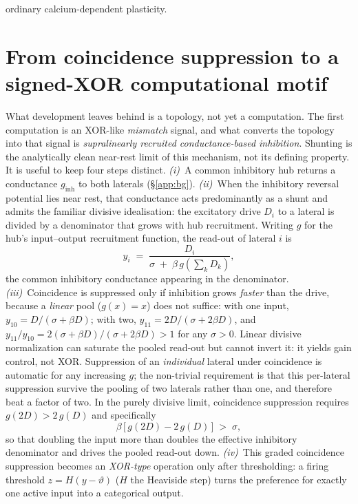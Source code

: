 \documentclass[11pt,a4paper]{article}
\begin{document}
ordinary calcium-dependent plasticity.

\section{From coincidence suppression to a signed-XOR computational motif}\label{sec:compute}
What development leaves behind is a topology, not yet a computation. The first computation is an XOR-like \emph{mismatch} signal, and what converts the topology into that signal is \emph{supralinearly recruited conductance-based inhibition}. Shunting is the analytically clean near-rest limit of this mechanism, not its defining property. It is useful to keep four steps distinct. \emph{(i)}~A common inhibitory hub returns a conductance $g_{\mathrm{inh}}$ to both laterals (\S\ref{app:bg}). \emph{(ii)}~When the inhibitory reversal potential lies near rest, that conductance acts predominantly as a shunt and admits the familiar divisive idealisation: the excitatory drive $D_i$ to a lateral is divided by a denominator that grows with hub recruitment. Writing $g$ for the hub's input--output recruitment function, the read-out of lateral $i$ is
\begin{equation}
y_i \;=\; \frac{D_i}{\sigma \;+\; \beta\, g\!\left(\textstyle\sum_{k} D_k\right)},
\label{eq:norm}
\end{equation}
the common inhibitory conductance appearing in the denominator. \emph{(iii)}~Coincidence is suppressed only if inhibition grows \emph{faster} than the drive, because a \emph{linear} pool ($g(x)=x$) does not suffice: with one input, $y_{10}=D/(\sigma+\beta D)$; with two, $y_{11}=2D/(\sigma+2\beta D)$, and $y_{11}/y_{10}=2(\sigma+\beta D)/(\sigma+2\beta D)>1$ for any $\sigma>0$. Linear divisive normalization can saturate the pooled read-out but cannot invert it: it yields gain control, not XOR. Suppression of an \emph{individual} lateral under coincidence is automatic for any increasing $g$; the non-trivial requirement is that this per-lateral suppression survive the pooling of two laterals rather than one, and therefore beat a factor of two. In the purely divisive limit, coincidence suppression requires $g(2D)>2\,g(D)$ and specifically
\begin{equation}
\beta\,\big[\,g(2D) - 2\,g(D)\,\big] \;>\; \sigma,
\label{eq:xorcond}
\end{equation}
so that doubling the input more than doubles the effective inhibitory denominator and drives the pooled read-out down. \emph{(iv)}~This graded coincidence suppression becomes an \emph{XOR-type} operation only after thresholding: a firing threshold $z=H(y-\vartheta)$ ($H$ the Heaviside step) turns the preference for exactly one active input into a categorical output.
\end{document}

